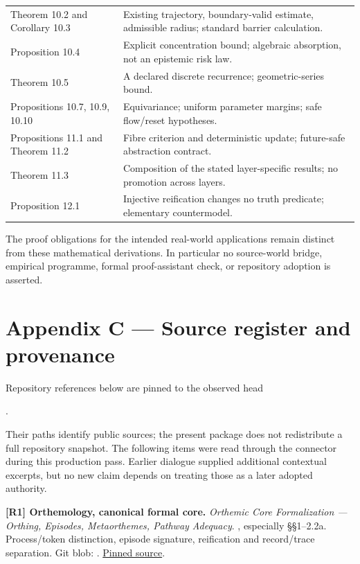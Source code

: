 \documentclass[11pt,a4paper]{article}
\begin{document}
\begin{longtable}[]{@{}
  >{\raggedright\arraybackslash}p{}
  >{\raggedright\arraybackslash}p{}@{}}
Theorem 10.2 and Corollary 10.3 & Existing trajectory, boundary-valid
estimate, admissible radius; standard barrier calculation. \\
Proposition 10.4 & Explicit concentration bound; algebraic absorption,
not an epistemic risk law. \\
Theorem 10.5 & A declared discrete recurrence; geometric-series
bound. \\
Propositions 10.7, 10.9, 10.10 & Equivariance; uniform parameter
margins; safe flow/reset hypotheses. \\
Propositions 11.1 and Theorem 11.2 & Fibre criterion and deterministic
update; future-safe abstraction contract. \\
Theorem 11.3 & Composition of the stated layer-specific results; no
promotion across layers. \\
Proposition 12.1 & Injective reification changes no truth predicate;
elementary countermodel. \\
\end{longtable}

The proof obligations for the intended real-world applications remain
distinct from these mathematical derivations. In particular no
source-world bridge, empirical programme, formal proof-assistant check,
or repository adoption is asserted.

\clearpage

\section*{Appendix C --- Source register and
provenance}\label{appendix-c-source-register-and-provenance}

Repository references below are pinned to the observed head

.

Their paths identify public sources; the present package does not
redistribute a full repository snapshot. The following items were read
through the connector during this production pass. Earlier dialogue
supplied additional contextual excerpts, but no new claim depends on
treating those as a later adopted authority.

\textbf{{[}R1{]} Orthemology, canonical formal core.} \emph{Orthemic
Core Formalization --- Orthing, Episodes, Metaorthemes, Pathway
Adequacy}. , especially
§§1--2.2a. Process/token distinction, episode signature, reification and
record/trace separation. Git blob:
.
\href{https://github.com/theislampill/orthemology/blob/f50dc1aee52356cc6adbef342387576b02afc124/theory/orthemic-core-formalization.md}{Pinned
source}.
\end{document}
